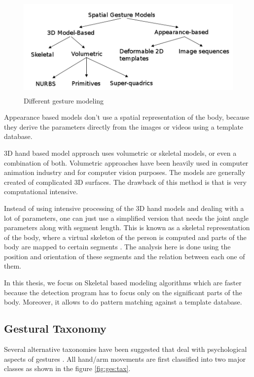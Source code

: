 \begin{figure}
	[h] \centering 
	\includegraphics[height=5cm]{figures/ges-model.png} 
	\caption{Different gesture modeling} 
	\label{fig:ges:model} 
\end{figure}

Appearance based models don't use a spatial representation of the body, because they derive the parameters directly from the images or videos using a template database. 

3D hand based model approach uses volumetric or skeletal models, or even a combination of  both. Volumetric approaches have been heavily used in computer animation industry and for computer vision purposes. The models are generally created of complicated 3D surfaces. The drawback of this method is that is very computational intensive. 

Instead of using intensive processing of the 3D hand models and dealing with a lot of parameters, one can just use a simplified version that needs the joint angle parameters along with segment length. This is known as a skeletal representation of the body, where a virtual skeleton of the person is computed and parts of the body are mapped to certain segments \cite{4}. The analysis here is done using the position and orientation of these segments and the relation between each one of them.

In this thesis, we focus on Skeletal based modeling algorithms which are faster because the detection program has to focus only on the significant parts of the body. Moreover, it allows to do pattern matching against a template database. 

\subsection{Gestural Taxonomy }
Several alternative taxonomies have been suggested that deal with psychological aspects of gestures \cite{3}. All hand/arm movements are first classified into two major classes as shown in the figure \ref{fig:ges:tax}.

